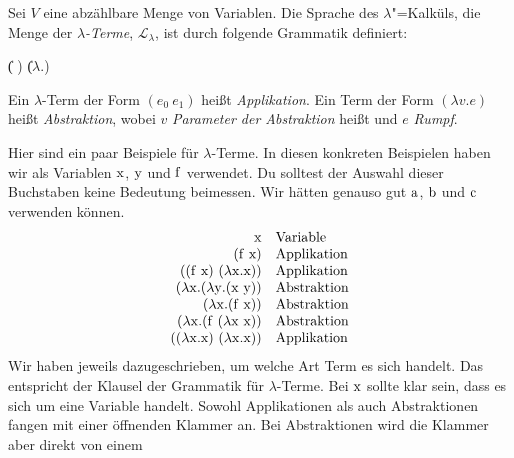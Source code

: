 \begin{definition}
  
  Sei $V$ eine abzählbare Menge von Variablen. 
  Die Sprache des $\lambda$"=Kalküls, die Menge der
  \textit{$\lambda$-Terme},
  $\mathcal{L}_{\lambda}$, ist
  durch folgende Grammatik definiert:
  \begin{grammar}
     \: 
    \> \| ( )
    \> \| ($\lambda$.)
  \end{grammar}
%
  Ein $\lambda$-Term der Form $(e_0~e_1)$ heißt
  \textit{Applikation}. Ein Term der Form
  $(\lambda v.e)$ heißt \textit{Abstraktion}, wobei
  $v$ \textit{Parameter der Abstraktion} heißt und
  $e$ \textit{Rumpf}.
\end{definition}
%
Hier sind ein paar Beispiele für $\lambda$-Terme.  In diesen konkreten
Beispielen haben wir als Variablen $\mathrm x$, $\mathrm y$ und $\mathrm f$
verwendet. Du solltest der Auswahl dieser Buchstaben keine Bedeutung
beimessen.  Wir hätten genauso gut $\mathrm a$, $\mathrm b$ und $\mathrm c$
verwenden können.
%
\begin{displaymath}
  \begin{array}{rl}
    \mathrm x & \textrm{Variable}\\
    (\mathrm f~\mathrm x) & \textrm{Applikation}\\
    ((\mathrm f~\mathrm x)~(\lambda\mathrm x.\mathrm x)) & \textrm{Applikation}\\
    (\lambda \mathrm x.(\lambda \mathrm y.(\mathrm x~\mathrm y)) & \textrm{Abstraktion}\\
    (\lambda \mathrm x.(\mathrm f~\mathrm x)) & \textrm{Abstraktion}\\
    (\lambda \mathrm x.(\mathrm f~(\lambda \mathrm x~\mathrm x)) & \textrm{Abstraktion}\\
    ((\lambda \mathrm x.\mathrm x)~(\lambda \mathrm x.\mathrm x))& \textrm{Applikation}
  \end{array}
\end{displaymath}
%
Wir haben jeweils dazugeschrieben, um welche Art Term es sich handelt.  Das
entspricht der Klausel der Grammatik für $\lambda$-Terme.  Bei 
$\mathrm x$ sollte klar sein, dass es sich um eine Variable handelt.
Sowohl Applikationen als auch Abstraktionen fangen mit einer öffnenden
Klammer an.  Bei Abstraktionen wird die Klammer aber direkt von einem
